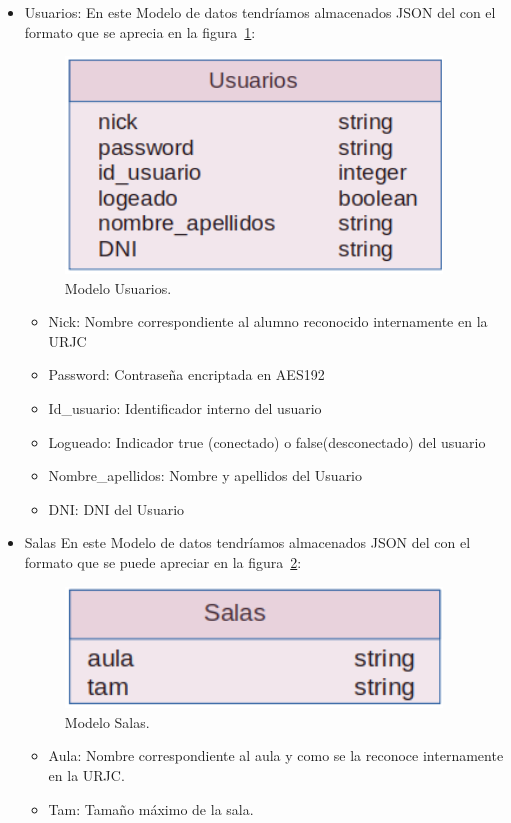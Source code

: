 \documentclass[a4paper, 12pt]{book}
\begin{document}
\begin{itemize}
	\item Usuarios: En este Modelo de datos tendríamos almacenados JSON del con el formato que se aprecia en la figura~\ref{fig:mongoDBUsuarios}:
	\begin{figure}
  	\centering
  	\includegraphics[width=10cm, keepaspectratio]{img/mongoDBUsuarios.png}
  	\caption{Modelo Usuarios.}\label{fig:mongoDBUsuarios}
	\end{figure}
		\begin{itemize}
		\item Nick: Nombre correspondiente al alumno reconocido internamente en la URJC
		\item Password: Contraseña encriptada en AES192
		\item Id\_usuario: Identificador interno del usuario
		\item Logueado: Indicador true (conectado) o false(desconectado) del usuario
		\item Nombre\_apellidos: Nombre y apellidos del Usuario
		\item DNI: DNI del Usuario
		\end{itemize}
	
	\item Salas En este Modelo de datos tendríamos almacenados JSON del con el formato que se puede apreciar en la figura~\ref{fig:mongoDBSalas}:
	\begin{figure}
  	\centering
  	\includegraphics[width=10cm, keepaspectratio]{img/mongoDBSalas.png}
  	\caption{Modelo Salas.}\label{fig:mongoDBSalas}
	\end{figure}
	
	\begin{itemize}
		\item Aula: Nombre correspondiente al aula y como se la reconoce internamente en la URJC.
		\item Tam: Tamaño máximo de la sala.
	\end{itemize}
	

\end{itemize}
\end{document}
